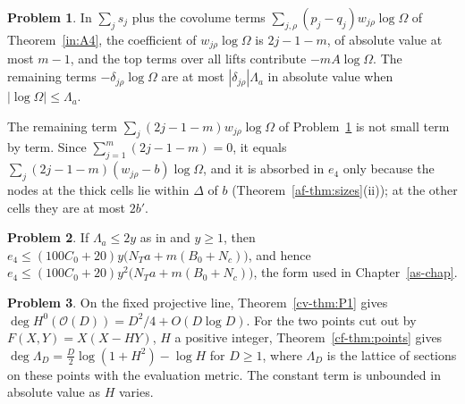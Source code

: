 \documentclass[reqno]{amsart}
\newcounter{chap}
\theoremstyle{definition}
\newtheorem{problem}{Problem}[section]
\theoremstyle{plain}
\begin{document}
\begin{problem}\label{pr:weights}
In $\sum_j s_j$ plus the covolume terms $\sum_{j,\rho}(p_j-q_j)w_{j\rho}\log\Omega$
of Theorem~\ref{in:A4}, the coefficient of $w_{j\rho}\log\Omega$ is $2j-1-m$,
of absolute value at most $m-1$, and the top terms over all lifts contribute
$-mA\log\Omega$.  The remaining terms $-\delta_{j\rho}\log\Omega$ are at most
$|\delta_{j\rho}|\Lambda_a$ in absolute value when $|\log\Omega|\le\Lambda_a$.
\end{problem}

The remaining term $\sum_j(2j-1-m)w_{j\rho}\log\Omega$ of
Problem~\ref{pr:weights} is not small term by term.  Since
$\sum_{j=1}^m(2j-1-m)=0$, it equals
$\sum_j(2j-1-m)(w_{j\rho}-b)\log\Omega$, and it is absorbed in $e_4$
only because the nodes at the thick cells lie within $\Delta$ of $b$
(Theorem~\ref{af-thm:sizes}(ii)); at the other cells they are at most
$2b'$.

\begin{problem}\label{pr:error}
If $\Lambda_a\le2y$ as in \cite[Lemma~18.15(iii)]{Adr} and $y\ge1$, then
$e_4\le(100C_0+20)y\bigl(N_Ta+m(B_0+N_c)\bigr)$, and hence
$e_4\le(100C_0+20)y^2\bigl(N_Ta+m(B_0+N_c)\bigr)$, the form used in
Chapter~\ref{as-chap}.
\end{problem}

\begin{problem}\label{pr:uniform}
On the fixed projective line, Theorem~\ref{cv-thm:P1} gives
$\deg H^0(\mathcal O(D))=D^2/4+O(D\log D)$.
For the two points cut out by $F(X,Y)=X(X-HY)$, $H$ a positive integer,
Theorem~\ref{cf-thm:points} gives
$\deg\Lambda_D=\tfrac D2\log(1+H^2)-\log H$ for $D\ge1$,
where $\Lambda_D$ is the lattice of sections on these points with
the evaluation metric.  The constant term is unbounded in absolute
value as $H$ varies.
\end{problem}
\end{document}
